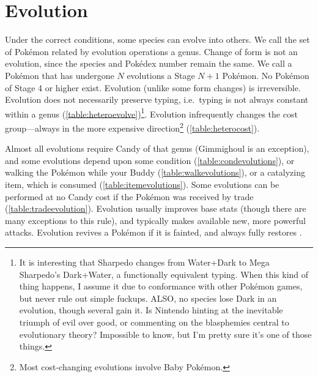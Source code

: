 \section{Evolution\label{sec:evolution}}
Under the correct conditions, some species can evolve into others.
We call the set of Pokémon related by evolution operations a genus.
Change of form is not an evolution, since the species and Pokédex number remain the same.
We call a Pokémon that has undergone $N$ evolutions a Stage $N+1$ Pokémon.
No Pokémon of Stage 4 or higher exist.
Evolution (unlike some form changes) is irreversible.
Evolution does not necessarily preserve typing, i.e.\ typing is not always constant within a genus (\autoref{table:heteroevolve})\footnote{It is interesting
  that Sharpedo changes from Water+Dark to Mega Sharpedo's Dark+Water,
  a functionally equivalent typing. When this kind of thing happens,
  I assume it due to conformance with other Pokémon games, but never
  rule out simple fuckups. ALSO, no species lose Dark in an evolution,
  though several gain it. Is Nintendo hinting at the inevitable triumph of
  evil over good, or commenting on the blasphemies central to evolutionary theory?
  Impossible to know, but I'm pretty sure it's one of those things.}.
Evolution infrequently changes the cost group---always in the more expensive direction\footnote{Most
  cost-changing evolutions involve Baby Pokémon.} (\autoref{table:heterocost}).

Almost all evolutions require Candy of that genus (Gimmighoul is an exception),
  and some evolutions depend upon some condition (\autoref{table:condevolutions}),
  or walking the Pokémon while your Buddy (\autoref{table:walkevolutions}),
  or a catalyzing item, which is consumed (\autoref{table:itemevolutions}).
Some evolutions can be performed at no Candy cost if the Pokémon was received by trade
 (\autoref{table:tradeevolution}).
Evolution usually improves base stats (though there are many exceptions to this rule),
  and typically makes available new, more powerful attacks.
Evolution revives a Pokémon if it is fainted, and always fully restores \HP\@.
